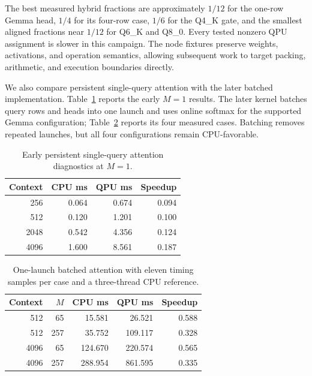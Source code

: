 \documentclass[sigplan,screen,review]{acmart}
\begin{document}
The best measured hybrid fractions are approximately \(1/12\) for the one-row Gemma head, \(1/4\) for its four-row case, \(1/6\) for the Q4\_K gate, and the smallest aligned fractions near \(1/12\) for Q6\_K and Q8\_0. Every tested nonzero QPU assignment is slower in this campaign. The node fixtures preserve weights, activations, and operation semantics, allowing subsequent work to target packing, arithmetic, and execution boundaries directly.

We also compare persistent single-query attention with the later batched implementation. Table~\ref{tab:attention-diagnostic} reports the early \(M=1\) results. The later kernel batches query rows and heads into one launch and uses online softmax for the supported Gemma configuration; Table~\ref{tab:attention-batched} reports its four measured cases. Batching removes repeated launches, but all four configurations remain CPU-favorable.

\begin{table}[t]
\centering
\caption{Early persistent single-query attention diagnostics at $M=1$.}
\label{tab:attention-diagnostic}
\small
\begin{tabular}{@{}rrrr@{}}
\toprule
Context & CPU ms & QPU ms & Speedup \\
\midrule
256 & 0.064 & 0.674 & 0.094 \\
512 & 0.120 & 1.201 & 0.100 \\
2048 & 0.542 & 4.356 & 0.124 \\
4096 & 1.600 & 8.561 & 0.187 \\
\bottomrule
\end{tabular}
\end{table}

\begin{table}[t]
\centering
\caption{One-launch batched attention with eleven timing samples per case and a three-thread CPU reference.}
\label{tab:attention-batched}
\small
\begin{tabular}{@{}rrrrr@{}}
\toprule
Context & $M$ & CPU ms & QPU ms & Speedup \\
\midrule
512 & 65 & 15.581 & 26.521 & 0.588 \\
512 & 257 & 35.752 & 109.117 & 0.328 \\
4096 & 65 & 124.670 & 220.574 & 0.565 \\
4096 & 257 & 288.954 & 861.595 & 0.335 \\
\bottomrule
\end{tabular}
\end{table}
\end{document}
